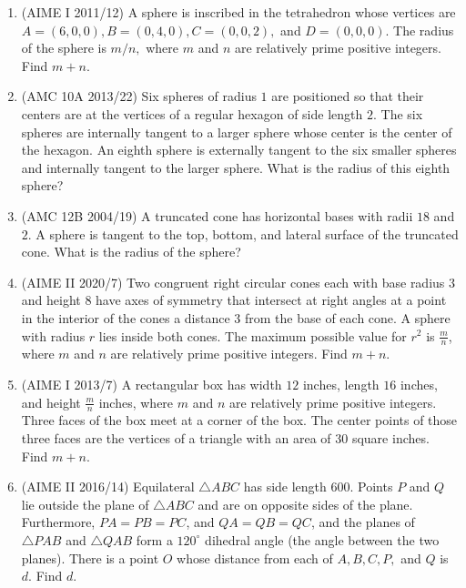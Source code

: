 \begin{enumerate}
\item (AIME I 2011/12) A sphere is inscribed in the tetrahedron whose vertices are $A = (6,0,0), B = (0,4,0), C = (0,0,2),$ and $D = (0,0,0).$ The radius of the sphere is $m/n,$ where $m$ and $n$ are relatively prime positive integers. Find $m + n.$

\item (AMC 10A 2013/22) Six spheres of radius $1$ are positioned so that their centers are at the vertices of a regular hexagon of side length $2$. The six spheres are internally tangent to a larger sphere whose center is the center of the hexagon. An eighth sphere is externally tangent to the six smaller spheres and internally tangent to the larger sphere. What is the radius of this eighth sphere?

\item (AMC 12B 2004/19) A truncated cone has horizontal bases with radii $18$ and $2$. A sphere is tangent to the top, bottom, and lateral surface of the truncated cone. What is the radius of the sphere?

\item (AIME II 2020/7) Two congruent right circular cones each with base radius $3$ and height $8$ have axes of symmetry that intersect at right angles at a point in the interior of the cones a distance $3$ from the base of each cone. A sphere with radius $r$ lies inside both cones. The maximum possible value for $r^2$ is $\frac mn$, where $m$ and $n$ are relatively prime positive integers. Find $m+n$.

\item (AIME I 2013/7) A rectangular box has width $12$ inches, length $16$ inches, and height $\frac{m}{n}$ inches, where $m$ and $n$ are relatively prime positive integers. Three faces of the box meet at a corner of the box. The center points of those three faces are the vertices of a triangle with an area of $30$ square inches. Find $m+n$.

\item (AIME II 2016/14) Equilateral $\triangle ABC$ has side length $600$. Points $P$ and $Q$ lie outside the plane of $\triangle ABC$ and are on opposite sides of the plane. Furthermore, $PA=PB=PC$, and $QA=QB=QC$, and the planes of $\triangle PAB$ and $\triangle QAB$ form a $120^{\circ}$ dihedral angle (the angle between the two planes). There is a point $O$ whose distance from each of $A,B,C,P,$ and $Q$ is $d$. Find $d$.
\end{enumerate}
